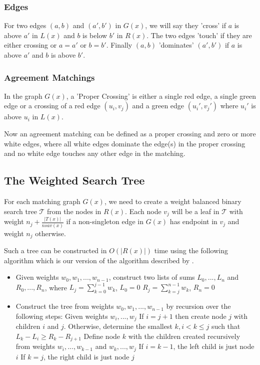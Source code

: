 \subsubsection{Edges}
For two edges $(a,b)$ and $(a',b')$ in $G(x)$, we will say they 'cross' if $a$ is above $a'$ in $L(x)$ and $b$ is below $b'$ in $R(x)$. The two edges 'touch' if they are either crossing or $a=a'$ or $b=b'$. Finally $(a,b)$ 'dominates' $(a',b')$ if $a$ is above $a'$ and $b$ is above $b'$.

\subsubsection{Agreement Matchings}
In the graph $G(x)$, a 'Proper Crossing' is either a single red edge, a single green edge or a crossing of a red edge $(u_i,v_j)$ and a green edge $(u_i',v_j')$ where $u_i'$ is above $u_i$ in $L(x)$.

Now an agreement matching can be defined as a proper crossing and zero or more white edges, where all white edges dominate the edge(s) in the proper crossing and no white edge touches any other edge in the matching.

\subsection{The Weighted Search Tree}
For each matching graph $G(x)$, we need to create a weight balanced binary search tree $\mathcal{T}$ from the nodes in $R(x)$. Each node $v_j$ will be a leaf in $\mathcal{T}$ with weight $n_j + \frac{|T(x)|}{nsav(x)}$ if a non-singleton edge in $G(x)$ has endpoint in $v_j$ and weight $n_j$ otherwise.

Such a tree can be constructed in $O(|R(x)|)$ time using the following algorithm which is our version of the algorithm described by .

\begin{itemize}
	\item Given weights ${w_0, w_1, ..., w_{n-1}}$, construct two lists of sums ${L_0, ..., L_{n}}$ and ${R_0, ..., R_{n}}$, where
	\subitem $L_j=\sum_{k=0}^{j-1} w_k$, $L_0=0$
	\subitem $R_j=\sum_{k=j}^{n-1} w_k$, $R_{n}=0$
	\item Construct the tree from weights ${w_0, w_1, ..., w_{n-1}}$ by recursion over the following steps:
	\subitem Given weights ${w_i, ..., w_j}$
	\subitem If $i=j+1$ then create node $j$ with children $i$ and $j$.
	\subitem Otherwise, determine the smallest $k, i<k\le j$ such that
	\subsubitem $L_k-L_i \ge R_k-R_{j+1}$
	\subitem Define node $k$ with the children created recursively from weights
	\subsubitem ${w_i, ..., w_{k-1}}$ and ${w_k, ..., w_j}$
	\subsubitem If $i=k-1$, the left child is just node $i$
	\subsubitem If $k=j$, the right child is just node $j$
\end{itemize}

